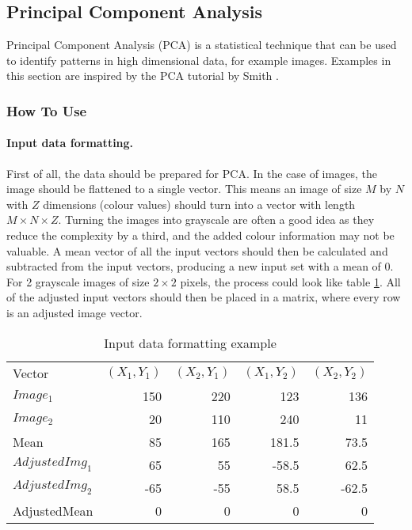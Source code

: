 \subsection{Principal Component Analysis}
\label{sub:PCA}
Principal Component Analysis (PCA) is a statistical technique that can be used to identify patterns in high dimensional data, for example images.
Examples in this section are inspired by the PCA tutorial by Smith \cite{smith2002tutorial}.

\subsubsection{How To Use}
\paragraph{Input data formatting.}
First of all, the data should be prepared for PCA.
In the case of images, the image should be flattened to a single vector.
This means an image of size $M$ by $N$ with $Z$ dimensions (colour values) should turn into a vector with length $M\times N\times Z$.
Turning the images into grayscale are often a good idea as they reduce the complexity by a third, and the added colour information may not be valuable.
A mean vector of all the input vectors should then be calculated and subtracted from the input vectors, producing a new input set with a mean of 0.
For 2 grayscale images of size $2\times 2$ pixels, the process could look like table \ref{tab:formattingexample}.
All of the adjusted input vectors should then be placed in a matrix, where every row is an adjusted image vector.

\begin{table}[h!]
\centering
\begin{tabular}{l|rrrr}
\hline
\noalign{\smallskip}
Vector & $(X_1, Y_1)$ & $(X_2, Y_1)$ & $(X_1, Y_2)$ & $(X_2, Y_2)$\\
\noalign{\smallskip}
\hline
\noalign{\smallskip}
$Image_1$ & 150 & 220 & 123 & 136 \\
$Image_2$ & 20 & 110 & 240 & 11 \\
Mean & 85 & 165 & 181.5 & 73.5 \\
$AdjustedImg_1$ & 65  & 55 & -58.5 & 62.5 \\
$AdjustedImg_2$ & -65 & -55 & 58.5 & -62.5 \\
AdjustedMean & 0 & 0 & 0 & 0 \\
\hline
\end{tabular}
\caption{Input data formatting example}\label{tab:formattingexample}
\end{table}

